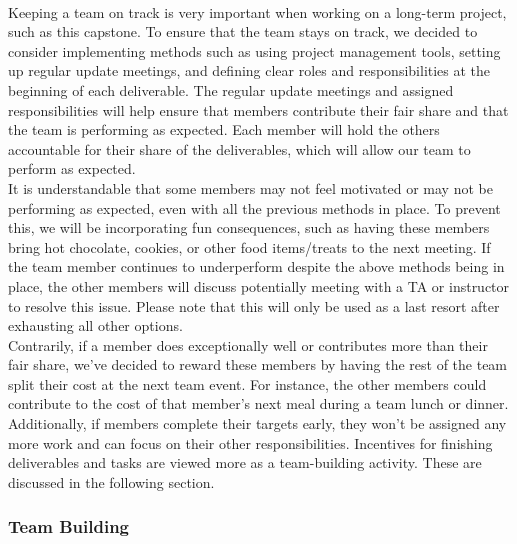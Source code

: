 \documentclass{article}
\begin{document}
 \\

Keeping a team on track is very important when working on a long-term project, such as this capstone. To ensure that the team stays on track, we decided to consider implementing methods such as using project management tools, setting up regular update meetings, and defining clear roles and responsibilities at the beginning of each deliverable. The regular update meetings and assigned responsibilities will help ensure that members contribute their fair share and that the team is performing as expected. Each member will hold the others accountable for their share of the deliverables, which will allow our team to perform as expected. \\

It is understandable that some members may not feel motivated or may not be performing as expected, even with all the previous methods in place. To prevent this, we will be incorporating fun consequences, such as having these members bring hot chocolate, cookies, or other food items/treats to the next meeting. If the team member continues to underperform despite the above methods being in place, the other members will discuss potentially meeting with a TA or instructor to resolve this issue. Please note that this will only be used as a last resort after exhausting all other options. \\

Contrarily, if a member does exceptionally well or contributes more than their fair share, we’ve decided to reward these members by having the rest of the team split their cost at the next team event. For instance, the other members could contribute to the cost of that member’s next meal during a team lunch or dinner. \\

Additionally, if members complete their targets early, they won’t be assigned any more work and can focus on their other responsibilities. Incentives for finishing deliverables and tasks are viewed more as a team-building activity. These are discussed in the following section. \\


\subsubsection*{Team Building}
\end{document}
